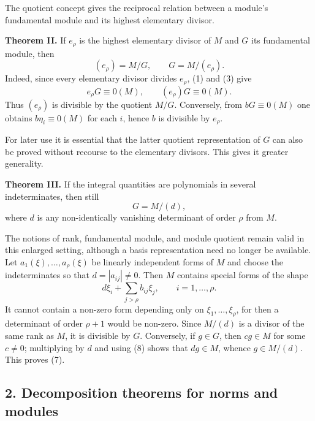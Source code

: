 \documentclass[11pt]{article}
\begin{document}
The quotient concept gives the reciprocal relation between a module's fundamental module and its highest elementary divisor.

\textbf{Theorem II.} If $e_\rho$ is the highest elementary divisor of $M$ and $G$ its fundamental module, then
\begin{equation}
  (e_\rho)=M/G,
  \qquad
  G=M/(e_\rho).                                                    \tag{5}
\end{equation}
Indeed, since every elementary divisor divides $e_\rho$, (1) and (3) give
\begin{equation}
  e_\rho G\equiv0(M),
  \qquad (e_\rho)G\equiv0(M).                                     \tag{6}
\end{equation}
Thus $(e_\rho)$ is divisible by the quotient $M/G$. Conversely, from $bG\equiv0(M)$ one obtains $b\eta_i\equiv0(M)$ for each $i$, hence $b$ is divisible by $e_\rho$.

For later use it is essential that the latter quotient representation of $G$ can also be proved without recourse to the elementary divisors. This gives it greater generality.

\textbf{Theorem III.} If the integral quantities are polynomials in several indeterminates, then still
\begin{equation}
  G=M/(d),                                                         \tag{7}
\end{equation}
where $d$ is any non-identically vanishing determinant of order $\rho$ from $M$.

The notions of rank, fundamental module, and module quotient remain valid in this enlarged setting, although a basis representation need no longer be available. Let $a_1(\xi),\ldots,a_\rho(\xi)$ be linearly independent forms of $M$ and choose the indeterminates so that $d=|a_{ij}|\ne0$. Then $M$ contains special forms of the shape
\begin{equation}
  d\xi_i+\sum_{j>\rho} b_{ij}\xi_j,
  \qquad i=1,\ldots,\rho.                                        \tag{8}
\end{equation}
It cannot contain a non-zero form depending only on $\xi_1,\ldots,\xi_\rho$, for then a determinant of order $\rho+1$ would be non-zero. Since $M/(d)$ is a divisor of the same rank as $M$, it is divisible by $G$. Conversely, if $g\in G$, then $c g\in M$ for some $c\ne0$; multiplying by $d$ and using (8) shows that $dg\in M$, whence $g\in M/(d)$. This proves (7).

\subsection{2. Decomposition theorems for norms and modules}
\end{document}
